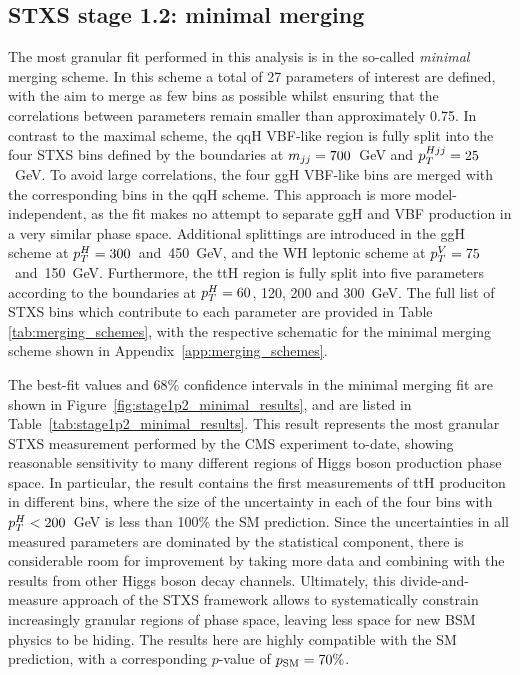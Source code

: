 \subsection{STXS stage 1.2: minimal merging}
The most granular fit performed in this analysis is in the so-called \textit{minimal} merging scheme. In this scheme a total of 27 parameters of interest are defined, with the aim to merge as few bins as possible whilst ensuring that the correlations between parameters remain smaller than approximately 0.75. In contrast to the maximal scheme, the qqH VBF-like region is fully split into the four STXS bins defined by the boundaries at $m_{jj}=700$~GeV and $p_T^{Hjj}=25$~GeV. To avoid large correlations, the four ggH VBF-like bins are merged with the corresponding bins in the qqH scheme. This approach is more model-independent, as the fit makes no attempt to separate ggH and VBF production in a very similar phase space. Additional splittings are introduced in the ggH scheme at $p_T^H=300$~and~450~GeV, and the WH leptonic scheme at $p_T^V=75$~and~150~GeV. Furthermore, the ttH region is fully split into five parameters according to the boundaries at $p_T^H=60$, 120, 200 and 300~GeV. The full list of STXS bins which contribute to each parameter are provided in Table \ref{tab:merging_schemes}, with the respective schematic for the minimal merging scheme shown in Appendix~\ref{app:merging_schemes}.

The \xsbr best-fit values and 68\% confidence intervals in the minimal merging fit are shown in Figure~\ref{fig:stage1p2_minimal_results}, and are listed in Table~\ref{tab:stage1p2_minimal_results}. This result represents the most granular STXS measurement performed by the CMS experiment to-date, showing reasonable sensitivity to many different regions of Higgs boson production phase space. In particular, the result contains the first measurements of ttH produciton in different bins, where the size of the uncertainty in each of the four bins with $p_T^H<200$~GeV is less than 100\% the SM prediction. Since the uncertainties in all measured parameters are dominated by the statistical component, there is considerable room for improvement by taking more data and combining with the results from other Higgs boson decay channels. Ultimately, this divide-and-measure approach of the STXS framework allows to systematically constrain increasingly granular regions of phase space, leaving less space for new BSM physics to be hiding. The results here are highly compatible with the SM prediction, with a corresponding $p$-value of $p_{\rm{SM}}=70\%$.

